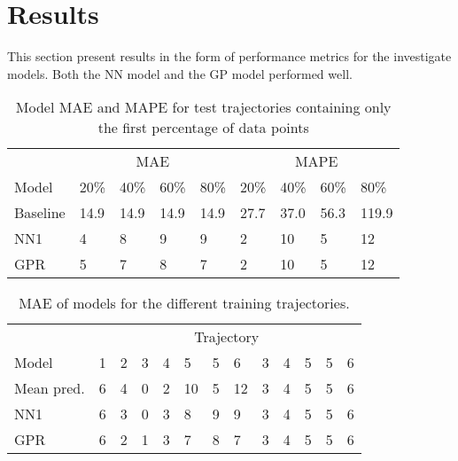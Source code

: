 
\captionsetup{width=.75\textwidth}


\chapter{Results}
\label{cha:results}
This section present results in the form of performance metrics for the investigate models. Both the NN model and the GP model performed well.
\begin{table}[H]
  \centering
  \caption{Model MAE and MAPE for test trajectories containing only the first percentage of data points}
  \label{tbl:models-mae-and-mape}
  \begin{tabular}{l | l | l | l | l || l | l | l | l }
    & \multicolumn{4}{c}{MAE} & \multicolumn{4}{c}{MAPE} \\
    Model      & 20\% & 40\% & 60\% & 80\% & 20\% & 40\% & 60\% & 80\% \\
    \hline
    Baseline & 14.9 & 14.9 & 14.9 & 14.9  & 27.7 & 37.0 & 56.3 & 119.9 \\
    NN1        & 4 &  8 & 9 &  9  & 2 & 10 & 5 & 12 \\
    GPR        & 5 &  7 & 8 &  7  & 2 & 10 & 5 & 12 \\
  \end{tabular}
\end{table}

\begin{table}[H]
  \centering
  \caption{MAE of models for the different training trajectories.}
  \label{tbl:model-mae-of-trajs}
  \begin{tabular}{ l | l | l | l | l | l | l | l | l | l | l | l | l }
    & \multicolumn{12}{c}{Trajectory} \\
    Model       & 1 & 2 & 3 & 4 & 5  & 5 & 6 & 3 & 4 & 5  & 5 & 6 \\
    \hline
    Mean pred.  & 6 & 4 & 0 & 2 & 10 & 5 & 12 & 3 & 4 & 5  & 5 & 6 \\
    NN1         & 6 & 3 & 0 & 3 &  8 & 9 &  9 & 3 & 4 & 5  & 5 & 6 \\
    GPR         & 6 & 2 & 1 & 3 &  7 & 8 &  7 & 3 & 4 & 5  & 5 & 6 \\
  \end{tabular}
\end{table}

